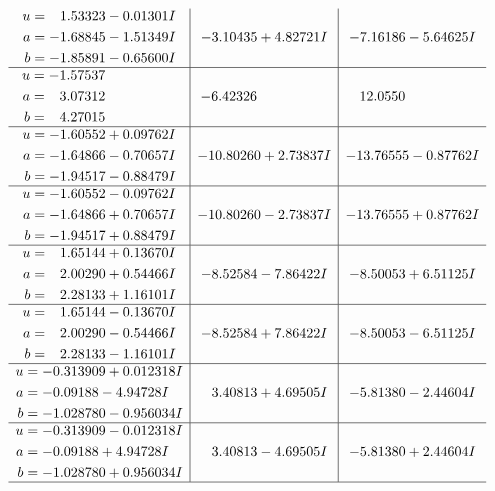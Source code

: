 \documentclass[1p]{elsarticle_modified}
\theoremstyle{definition}
\begin{document}
$$\begin{array}{c|c|c}
\begin{aligned}
u &= \phantom{-}1.53323 - 0.01301 I \\
a &= -1.68845 - 1.51349 I \\
b &= -1.85891 - 0.65600 I\end{aligned}
 & -3.10435 + 4.82721 I & -7.16186 - 5.64625 I \\ \hline\begin{aligned}
u &= -1.57537\phantom{ +0.000000I} \\
a &= \phantom{-}3.07312\phantom{ +0.000000I} \\
b &= \phantom{-}4.27015\phantom{ +0.000000I}\end{aligned}
 & -6.42326\phantom{ +0.000000I} & \phantom{-}12.0550\phantom{ +0.000000I} \\ \hline\begin{aligned}
u &= -1.60552 + 0.09762 I \\
a &= -1.64866 - 0.70657 I \\
b &= -1.94517 - 0.88479 I\end{aligned}
 & -10.80260 + 2.73837 I & -13.76555 - 0.87762 I \\ \hline\begin{aligned}
u &= -1.60552 - 0.09762 I \\
a &= -1.64866 + 0.70657 I \\
b &= -1.94517 + 0.88479 I\end{aligned}
 & -10.80260 - 2.73837 I & -13.76555 + 0.87762 I \\ \hline\begin{aligned}
u &= \phantom{-}1.65144 + 0.13670 I \\
a &= \phantom{-}2.00290 + 0.54466 I \\
b &= \phantom{-}2.28133 + 1.16101 I\end{aligned}
 & -8.52584 - 7.86422 I & -8.50053 + 6.51125 I \\ \hline\begin{aligned}
u &= \phantom{-}1.65144 - 0.13670 I \\
a &= \phantom{-}2.00290 - 0.54466 I \\
b &= \phantom{-}2.28133 - 1.16101 I\end{aligned}
 & -8.52584 + 7.86422 I & -8.50053 - 6.51125 I \\ \hline\begin{aligned}
u &= -0.313909 + 0.012318 I \\
a &= -0.09188 - 4.94728 I \\
b &= -1.028780 - 0.956034 I\end{aligned}
 & \phantom{-}3.40813 + 4.69505 I & -5.81380 - 2.44604 I \\ \hline\begin{aligned}
u &= -0.313909 - 0.012318 I \\
a &= -0.09188 + 4.94728 I \\
b &= -1.028780 + 0.956034 I\end{aligned}
 & \phantom{-}3.40813 - 4.69505 I & -5.81380 + 2.44604 I\\
 \hline 
 \end{array}$$\newpage
\end{document}
